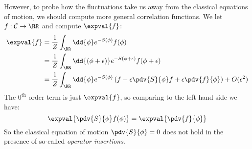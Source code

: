 \documentclass{jknotes}
\begin{document}
However, to probe how the fluctuations take us away from the classical equations of motion, we should compute more general correlation functions. We let \(f:\mathcal{C}\rightarrow\RR\) and compute \(\expval{f}\):
\begin{align}
    \expval{f} &= \frac{1}{Z}\int_\RR\dd{\phi}e^{-S(\phi)}f(\phi) \\
    &= \frac{1}{Z} \int_\RR\dd{(\phi+\epsilon)} e^{-S(\phi+\epsilon)}f(\phi+\epsilon) \\
    &= \frac{1}{Z} \int_\RR \dd{\phi} e^{-S(\phi)} \left( f-\epsilon\pdv{S}{\phi}f + \epsilon\pdv{f}{\phi} \right) + O(\epsilon^2)
\end{align}
The \(0^\text{th}\) order term is just \(\expval{f}\), so comparing to the left hand side we have:
\begin{equation}
    \expval{\pdv{S}{\phi}f(\phi)} = \expval{\pdv{f}{\phi}}
\end{equation}
So the classical equation of motion \(\pdv{S}{\phi}=0\) does not hold in the presence of so-called \emph{operator insertions}.
\end{document}
